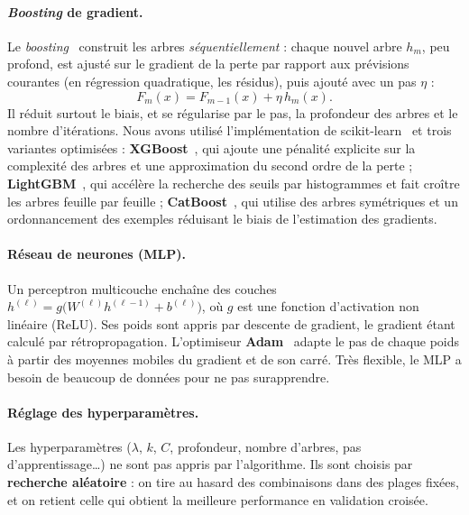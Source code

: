 \paragraph{\emph{Boosting} de gradient.} Le \emph{boosting}~\cite{friedman2001} construit les arbres \emph{séquentiellement} : chaque nouvel arbre $h_m$, peu profond, est ajusté sur le gradient de la perte par rapport aux prévisions courantes (en régression quadratique, les résidus), puis ajouté avec un pas $\eta$ :
\begin{equation}
  F_m(x) = F_{m-1}(x) + \eta\, h_m(x).
\end{equation}
Il réduit surtout le biais, et se régularise par le pas, la profondeur des arbres et le nombre d'itérations. Nous avons utilisé l'implémentation de scikit-learn~\cite{pedregosa2011} et trois variantes optimisées : \textbf{XGBoost}~\cite{chen2016}, qui ajoute une pénalité explicite sur la complexité des arbres et une approximation du second ordre de la perte ; \textbf{LightGBM}~\cite{ke2017}, qui accélère la recherche des seuils par histogrammes et fait croître les arbres feuille par feuille ; \textbf{CatBoost}~\cite{prokhorenkova2018}, qui utilise des arbres symétriques et un ordonnancement des exemples réduisant le biais de l'estimation des gradients.

\paragraph{Réseau de neurones (MLP).} Un perceptron multicouche enchaîne des couches $h^{(\ell)} = g\big(W^{(\ell)} h^{(\ell-1)} + b^{(\ell)}\big)$, où $g$ est une fonction d'activation non linéaire (ReLU). Ses poids sont appris par descente de gradient, le gradient étant calculé par rétropropagation. L'optimiseur \textbf{Adam}~\cite{kingma2015} adapte le pas de chaque poids à partir des moyennes mobiles du gradient et de son carré. Très flexible, le MLP a besoin de beaucoup de données pour ne pas surapprendre.

\paragraph{Réglage des hyperparamètres.} Les hyperparamètres ($\lambda$, $k$, $C$, profondeur, nombre d'arbres, pas d'apprentissage\dots) ne sont pas appris par l'algorithme. Ils sont choisis par \textbf{recherche aléatoire} : on tire au hasard des combinaisons dans des plages fixées, et on retient celle qui obtient la meilleure performance en validation croisée.


